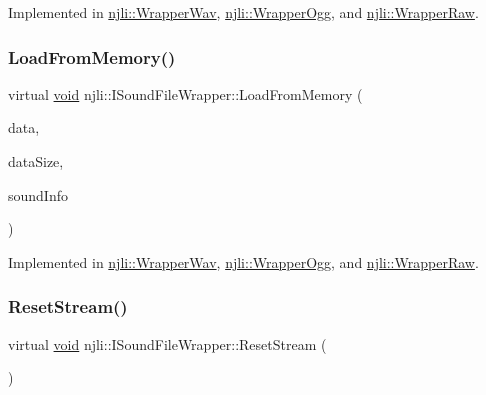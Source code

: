 Implemented in \mbox{\hyperlink{classnjli_1_1_wrapper_wav_a43b8306e554b224968ef436020416765}{njli\+::\+Wrapper\+Wav}}, \mbox{\hyperlink{classnjli_1_1_wrapper_ogg_a315af49a4e484e1cb8689a11dfe9db2f}{njli\+::\+Wrapper\+Ogg}}, and \mbox{\hyperlink{classnjli_1_1_wrapper_raw_a9286adcc339118eac5d143ad73b646a7}{njli\+::\+Wrapper\+Raw}}.

\mbox{\label{classnjli_1_1_i_sound_file_wrapper_a2c4dc8cc613f8f545b0e1ead86ee7e4d}} 
\subsubsection{\texorpdfstring{Load\+From\+Memory()}{LoadFromMemory()}}
{\footnotesize\ttfamily virtual \mbox{\hyperlink{_thread_8h_af1e856da2e658414cb2456cb6f7ebc66}{void}} njli\+::\+I\+Sound\+File\+Wrapper\+::\+Load\+From\+Memory (\begin{DoxyParamCaption}\item[{char $\ast$}]{data,  }\item[{int}]{data\+Size,  }\item[{Sound\+Info $\ast$}]{sound\+Info }\end{DoxyParamCaption})\hspace{0.3cm}{\ttfamily [pure virtual]}}



Implemented in \mbox{\hyperlink{classnjli_1_1_wrapper_wav_a93b83be038f6d2bc269720b0fa91d841}{njli\+::\+Wrapper\+Wav}}, \mbox{\hyperlink{classnjli_1_1_wrapper_ogg_a3ba50f99487d489f0b495cfe7fa77811}{njli\+::\+Wrapper\+Ogg}}, and \mbox{\hyperlink{classnjli_1_1_wrapper_raw_aca473a80ec7a02e3df6a74b171c2d1fb}{njli\+::\+Wrapper\+Raw}}.

\mbox{\label{classnjli_1_1_i_sound_file_wrapper_ab302d724c78a9a55f6dcb288d31e6854}} 
\subsubsection{\texorpdfstring{Reset\+Stream()}{ResetStream()}}
{\footnotesize\ttfamily virtual \mbox{\hyperlink{_thread_8h_af1e856da2e658414cb2456cb6f7ebc66}{void}} njli\+::\+I\+Sound\+File\+Wrapper\+::\+Reset\+Stream (\begin{DoxyParamCaption}{ }\end{DoxyParamCaption})\hspace{0.3cm}{\ttfamily [pure virtual]}}



